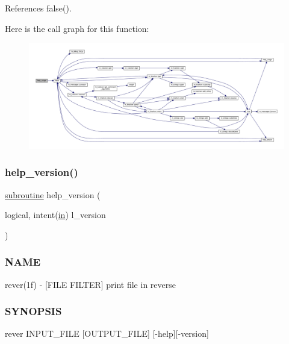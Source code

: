 References false().

Here is the call graph for this function\+:
\nopagebreak
\begin{figure}[H]
\begin{center}
\leavevmode
\includegraphics[width=350pt]{rever_8f90_a3e09a3b52ee8fb04eeb93fe5761626a8_cgraph}
\end{center}
\end{figure}
\mbox{\label{rever_8f90_a39c21619b08a3c22f19e2306efd7f766}} 
\subsubsection{\texorpdfstring{help\+\_\+version()}{help\_version()}}
{\footnotesize\ttfamily \hyperlink{M__stopwatch_83_8txt_acfbcff50169d691ff02d4a123ed70482}{subroutine} help\+\_\+version (\begin{DoxyParamCaption}\item[{logical, intent(\hyperlink{M__journal_83_8txt_afce72651d1eed785a2132bee863b2f38}{in})}]{l\+\_\+version }\end{DoxyParamCaption})}



\subsubsection*{N\+A\+ME}

rever(1f) -\/ \mbox{[}F\+I\+LE F\+I\+L\+T\+ER\mbox{]} print file in reverse 

\subsubsection*{S\+Y\+N\+O\+P\+S\+IS}

\begin{DoxyVerb}    rever INPUT_FILE [OUTPUT_FILE] [-help][-version]
\end{DoxyVerb}


